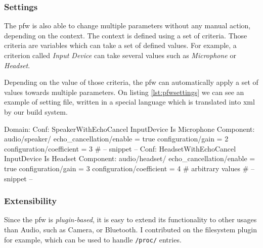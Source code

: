 \subsubsection{Settings}
The \gls{pfw} is also able to change multiple parameters without any manual action, depending on the context.
The context is defined using a set of criteria. Those criteria are variables which can take a set of defined values.
For example, a criterion called \emph{Input Device} can take several values such as \emph{Microphone} or \emph{Headset}.

Depending on the value of those criteria, the \gls{pfw} can automatically apply a set of values towards
multiple parameters.
On listing \ref{lst:pfwsettings} we can see an example of setting file, written in a special language
which is translated into \gls{xml} by our build system.

\begin{code}[language=pfwLang, caption=Settings file example, label=lst:pfwsettings]
Domain:
    Conf: SpeakerWithEchoCancel
        InputDevice Is Microphone
        Component: audio/speaker/
            echo_cancellation/enable = true
            configuration/gain = 2
            configuration/coefficient = 3
        # -- snippet --
    Conf: HeadsetWithEchoCancel
        InputDevice Is Headset
        Component: audio/headset/
            echo_cancellation/enable = true
            configuration/gain = 3
            configuration/coefficient = 4 # arbitrary values
        # -- snippet --
\end{code}

\subsubsection{Extensibility}
Since the \gls{pfw} is \emph{plugin-based}, it is easy to extend its functionality to other usages than Audio, such
as Camera, or Bluetooth. I contributed on the filesystem plugin for example, which can be used to handle \lstinline{/proc/} entries.
